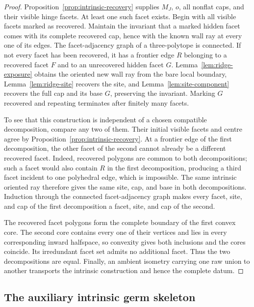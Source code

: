 \documentclass[11pt]{amsart}
\theoremstyle{definition}
\begin{document}
\begin{proof}
Proposition~\ref{prop:intrinsic-recovery} supplies $M_J$, $o$, all nonflat
caps, and their visible hinge facets.  At least one such facet exists.  Begin
with all visible facets marked as recovered.  Maintain the invariant that a
marked hidden facet comes with its complete recovered cap, hence with the
known wall ray at every one of its edges.  The facet-adjacency graph of a
three-polytope is connected.  If not every facet has been recovered, it has a
frontier edge $R$ belonging to a recovered facet $F$ and to an unrecovered
hidden facet $G$.  Lemma~\ref{lem:ridge-exposure} obtains the oriented new
wall ray from the bare local boundary, Lemma~\ref{lem:ridge-site} recovers the
site, and Lemma~\ref{lem:site-component} recovers the full cap and its base
$G$, preserving the invariant.  Marking $G$ recovered and repeating
terminates after finitely many facets.

To see that this construction is independent of a chosen compatible
decomposition, compare any two of them.  Their initial visible facets and
centre agree by Proposition~\ref{prop:intrinsic-recovery}.  At a frontier edge
of the first decomposition, the other facet of the second cannot already be a
different recovered facet.  Indeed, recovered polygons are common to both
decompositions; such a facet would also contain $R$ in the first
decomposition, producing a third facet incident to one polyhedral edge, which
is impossible.  The same intrinsic oriented ray therefore gives the same
site, cap, and base in both decompositions.  Induction through the connected
facet-adjacency graph makes every facet, site, and cap of the first
decomposition a facet, site, and cap of the second.

The recovered facet polygons form the complete boundary of the first convex
core.  The second core contains every one of their vertices and lies in every
corresponding inward halfspace, so convexity gives both inclusions and the
cores coincide.  Its irredundant facet set admits no additional facet.  Thus
the two decompositions are equal.  Finally, an ambient isometry carrying one
raw union to another transports the intrinsic construction and hence the
complete datum.
\end{proof}

\subsection{The auxiliary intrinsic germ skeleton}
\label{subsec:auxiliary-skeleton}
\end{document}
